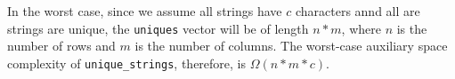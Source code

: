 \documentclass[12pt, letterpaper]{article}
\begin{document}
In the worst case, since we assume all strings have $ c $ characters annd all are strings are unique, the \texttt{uniques} vector will be of length $ n * m $, where $ n $ is the number of rows and $ m $ is the number of columns. The worst-case auxiliary space complexity of \texttt{unique\_strings}, therefore, is $ \Omega (n * m * c) $.
\end{document}
